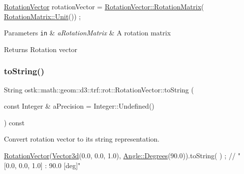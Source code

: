 \begin{DoxyCode}
\hyperlink{classostk_1_1math_1_1geom_1_1d3_1_1trf_1_1rot_1_1_rotation_vector_ad05e6af649dbdd145793773e2ab1cdce}{RotationVector} rotationVector = \hyperlink{classostk_1_1math_1_1geom_1_1d3_1_1trf_1_1rot_1_1_rotation_vector_a70393e9ab7237fbb7510ce19a17abd0c}{RotationVector::RotationMatrix}(
      \hyperlink{classostk_1_1math_1_1geom_1_1d3_1_1trf_1_1rot_1_1_rotation_matrix_a37c25a2ddaa1dcd24be8dd568259a9b8}{RotationMatrix::Unit}()) ;
\end{DoxyCode}



\begin{DoxyParams}[1]{Parameters}
\mbox{\tt in}  & {\em a\+Rotation\+Matrix} & A rotation matrix \\
\hline
\end{DoxyParams}
\begin{DoxyReturn}{Returns}
Rotation vector 
\end{DoxyReturn}
\mbox{\label{classostk_1_1math_1_1geom_1_1d3_1_1trf_1_1rot_1_1_rotation_vector_a3071c77017b37d45b3db74262e42ac3d}} 
\subsubsection{\texorpdfstring{to\+String()}{toString()}}
{\footnotesize\ttfamily String ostk\+::math\+::geom\+::d3\+::trf\+::rot\+::\+Rotation\+Vector\+::to\+String (\begin{DoxyParamCaption}\item[{const Integer \&}]{a\+Precision = {\ttfamily Integer\+:\+:Undefined()} }\end{DoxyParamCaption}) const}



Convert rotation vector to its string representation. 


\begin{DoxyCode}
\hyperlink{classostk_1_1math_1_1geom_1_1d3_1_1trf_1_1rot_1_1_rotation_vector_ad05e6af649dbdd145793773e2ab1cdce}{RotationVector}(\hyperlink{namespaceostk_1_1math_1_1obj_a18744cbf433bce59f6758d9fe3b1dff1}{Vector3d}(0.0, 0.0, 1.0), \hyperlink{classostk_1_1math_1_1geom_1_1_angle_a2cefda601167af07f61f0477776203ca}{Angle::Degrees}(90.0)).toString(
      ) ; \textcolor{comment}{// "[0.0, 0.0, 1.0] : 90.0 [deg]"}
\end{DoxyCode}



